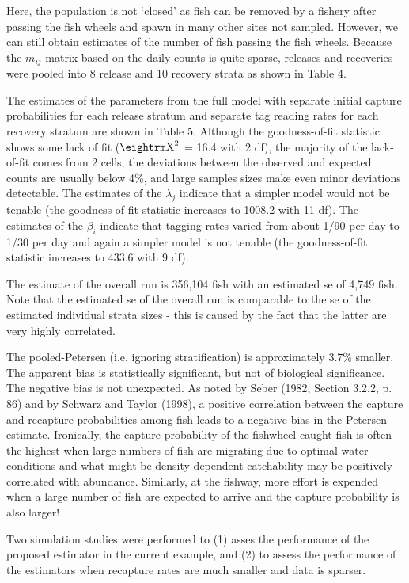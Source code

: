 Here, the population is not `closed' as fish can be removed by
a fishery after passing the fish wheels and spawn in 
many other sites not sampled. However, we can
still obtain estimates of the number of fish passing
the fish wheels.
Because the $m_{ij}$ matrix based on the daily counts is quite
sparse, releases and recoveries were pooled into 8 release and
10 recovery strata as shown in Table 4.

The estimates of the parameters from the full model with separate
initial capture probabilities for each release stratum and 
separate tag reading rates for each recovery stratum are shown
in Table 5.
Although the goodness-of-fit statistic shows some lack of fit
(${\rm X}^2$ = 16.4 with 2 df),
the
majority of the lack-of-fit comes from 2 cells, the
deviations between the observed and expected counts are usually below 4\%, and
large samples sizes make even minor deviations detectable.
The estimates of the $\lambda _j$ indicate that a simpler
model would not be tenable (the goodness-of-fit statistic increases
to 1008.2 with 11 df). The estimates of
the $\beta _i$ indicate that tagging rates varied from about 
1/90 per day to 1/30 per day and again a simpler
model is not tenable (the goodness-of-fit statistic increases
to 433.6 with 9 df). 

The estimate of the overall run is 356,104 fish with an 
estimated se of 4,749 fish. Note that the
estimated se of the overall run is comparable to the se
of the estimated individual strata sizes - this is caused
by the fact that the latter are very highly correlated.


The pooled-Petersen (i.e. ignoring
stratification) is approximately 3.7\% smaller. 
The apparent bias is statistically significant, but not of
biological significance.
The negative bias is not unexpected. As noted by Seber (1982, Section 3.2.2, p. 86) and
by Schwarz and Taylor (1998), a positive correlation
between the capture and recapture probabilities among
fish leads to a negative bias in the Petersen estimate.
Ironically, the capture-probability of the fishwheel-caught fish is often
the highest when large numbers of fish are migrating due to 
optimal water conditions and what might
be density dependent catchability may be positively
correlated with abundance.
Similarly, at the fishway, more effort is expended when
a large number of fish are expected to arrive and the
capture probability is also larger!


Two simulation studies were performed to (1) asses the performance
of the proposed estimator in the current example, and (2)
to assess the performance of the estimators when recapture
rates are much smaller and data is sparser.

